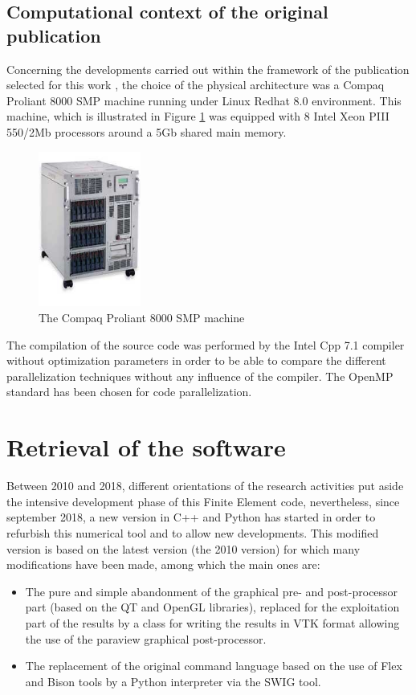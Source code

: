 \subsection{Computational context of the original publication}
Concerning the developments carried out within the framework of the publication selected for this work \cite{Pantale:2005}, the choice of the physical architecture was a Compaq Proliant 8000 SMP machine running under Linux Redhat 8.0 environment. This machine, which is illustrated in Figure \ref{proliant} was equipped with 8 Intel Xeon PIII 550/2Mb processors around a 5Gb shared main memory. 
\begin{figure}[h] 
  \centering
  \includegraphics[width=0.3\textwidth]{./8000_photo.jpg}
  \caption{The Compaq Proliant 8000 SMP machine}
  \label{proliant}
\end{figure}
The compilation of the source code was performed by the Intel Cpp 7.1 compiler without optimization parameters in order to be able to compare the different parallelization techniques without any influence of the compiler. The OpenMP standard has been chosen for code parallelization.

\section{Retrieval of the software}

Between 2010 and 2018, different orientations of the research activities put aside the intensive development phase of this Finite Element code, nevertheless, since september 2018, a new version in C++ and Python has started in order to refurbish this numerical tool and to allow new developments. This modified version is based on the latest version (the 2010 version) for which many modifications have been made, among which the main ones are:
\begin{itemize}
\item The pure and simple abandonment of the graphical pre- and post-processor part (based on the QT and OpenGL libraries), replaced for the exploitation part of the results by a class for writing the results in VTK format allowing the use of the paraview graphical post-processor.
\item The replacement of the original command language based on the use of Flex and Bison tools by a Python interpreter via the SWIG tool.
\end{itemize}

